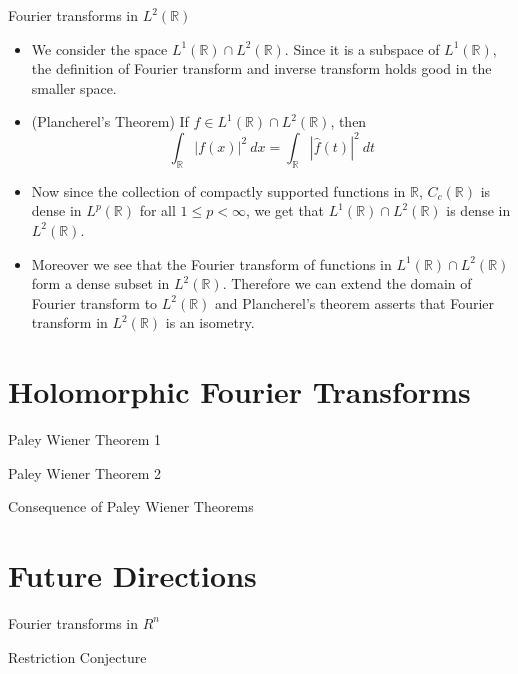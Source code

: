 \documentclass[compress]{beamer}
\newcommand{\R}{\mathbb R}
\begin{document}
\begin{frame}{Fourier transforms in $L^2(\R)$}
  \begin{itemize}
    \item We consider the space $L^1(\R) \cap L^2(\R)$. Since it is a subspace of $L^1(\R)$, the definition of Fourier transform and inverse transform holds good in the smaller space.
    \item (Plancherel's Theorem) If $f \in L^1(\R) \cap L^2(\R)$, then $$\int_\R |f(x)|^2 \ dx = \int_\R |\hat{f}(t)|^2 \ dt$$
    \item Now since the collection of compactly supported functions in $\R$, $C_c(\R)$ is dense in $L^p(\R)$ for all $1 \le p < \infty$, we get that $L^1(\R) \cap L^2(\R)$ is dense in $L^2(\R)$.
    \item Moreover we see that the Fourier transform of functions in $L^1(\R) \cap L^2(\R)$ form a dense subset in $L^2(\R)$. Therefore we can extend the domain of Fourier transform to $L^2(\R)$ and Plancherel's theorem asserts that Fourier transform in $L^2(\R)$ is an isometry.
  \end{itemize}
\end{frame}

\section{Holomorphic Fourier Transforms}

\begin{frame}{Paley Wiener Theorem 1}
\end{frame}

\begin{frame}{Paley Wiener Theorem 2}
\end{frame}

\begin{frame}{Consequence of Paley Wiener Theorems}
\end{frame}

\section{Future Directions}

\begin{frame}{Fourier transforms in $R^n$}
\end{frame}

\begin{frame}{Restriction Conjecture}
\end{frame}
\end{document}

